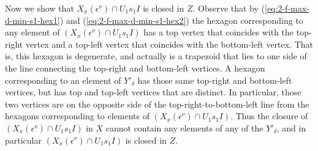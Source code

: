 \documentclass{amsart}
\theoremstyle{definition}
\def\e{\epsilon}
\def\en{\e^{\nu}}
\def\X{X_x(\en)}
\begin{document}
  Now we show that $\X \cap U_1 s_1 I$ is closed in $Z$.  Observe that by
  (\ref{eq:2-f-max-d-min-s1-hex1}) and (\ref{eq:2-f-max-d-min-s1-hex2}) the
  hexagon corresponding to any element of $(\X \cap U_1 s_1 I)$ has a top
  vertex that coincides with the top-right vertex and a top-left vertex that
  coincides with the bottom-left vertex.  That is, this hexagon is
  degenerate, and actually is a trapezoid that lies to one side of the line
  connecting the top-right and bottom-left vertices.  A hexagon corresponding
  to an element of $Y'_\delta$ has those same top-right and bottom-left
  vertices, but has top and top-left vertices that are distinct.  In
  particular, those two vertices are on the opposite side of the
  top-right-to-bottom-left line from the hexagons corresponding to elements of
  $(\X \cap U_1 s_1 I)$.  Thus the closure of $(\X \cap U_1 s_1 I)$ in $X$
  cannot contain any elements of any of the $Y'_\delta$, and in particular $(\X
  \cap U_1 s_1 I)$ is closed in $Z$.
\end{document}
